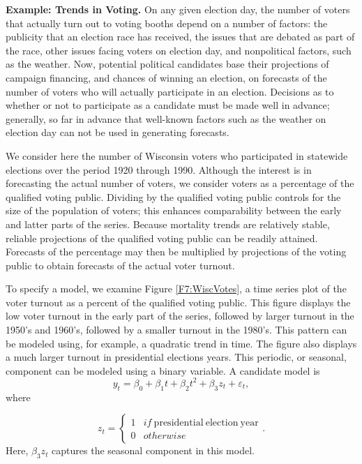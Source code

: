 \linejed

\textbf{Example: Trends in Voting.} On
any given election day, the number of voters that actually turn out
to voting booths depend on a number of factors: the publicity that
an election race has received, the issues that are debated as part
of the race, other issues facing voters on election day, and
nonpolitical factors, such as the weather. Now, potential political
candidates base their projections of campaign financing, and chances
of winning an election, on forecasts of the number of voters who
will actually participate in an election. Decisions as to whether or
not to participate as a candidate must be made well in advance;
generally, so far in advance that well-known factors such as the
weather on election day can not be used in generating forecasts.

We consider here the number of Wisconsin voters who participated in
statewide elections over the period 1920 through 1990. Although the interest
is in forecasting the actual number of voters, we consider voters as a
percentage of the qualified voting public. Dividing by the qualified voting
public controls for the size of the population of voters; this enhances
comparability between the early and latter parts of the series. Because
mortality trends are relatively stable, reliable projections of the
qualified voting public can be readily attained. Forecasts of the percentage
may then be multiplied by projections of the voting public to obtain
forecasts of the actual voter turnout.

To specify a model, we examine Figure \ref{F7:WiscVotes}, a time
series plot of the voter turnout as a percent of the qualified
voting public. This figure displays the low voter turnout in the
early part of the series, followed by larger turnout in the 1950's
and 1960's, followed by a smaller turnout in the 1980's. This
pattern can be modeled using, for example, a quadratic trend in
time. The figure also displays a much larger turnout in presidential
elections years. This periodic, or seasonal, component can be
modeled using a binary variable. A candidate model is
\begin{equation*}
y_t=\beta_0+\beta_1t+\beta_2t^2+\beta_{3}z_t+\varepsilon _t,
\end{equation*}
where

\begin{equation*}
z_t=\left\{
\begin{array}{ll}
1 & if~\mathrm{presidential\ election\ year} \\
0 & otherwise
\end{array}
\right. .
\end{equation*}
Here, $\beta_{3}z_t$ captures the seasonal component in this model.

